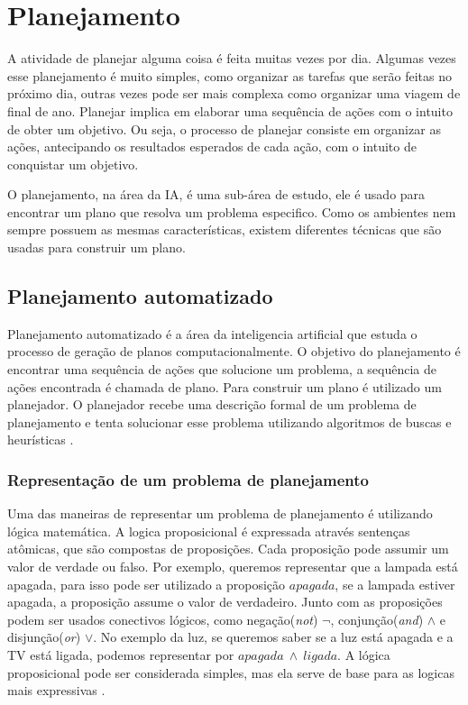 \chapter{\label{chap:planejamento}Planejamento}

A atividade de planejar alguma coisa é feita muitas vezes por dia. Algumas vezes esse planejamento é muito simples, como organizar as tarefas que serão feitas no próximo dia, outras vezes pode ser mais complexa como organizar uma viagem de final de ano. Planejar implica em elaborar uma sequência de ações com o intuito de obter um objetivo. Ou seja, o processo de planejar consiste em organizar as ações, antecipando os resultados esperados de cada ação, com o intuito de conquistar um objetivo. 

O planejamento, na área da IA, é uma sub-área de estudo, ele é usado para encontrar um plano que resolva um problema especifico. Como os ambientes nem sempre possuem as mesmas características, existem diferentes técnicas que são usadas para construir um plano.

\section{Planejamento automatizado}

Planejamento automatizado é a área da inteligencia artificial que estuda o processo de geração de planos computacionalmente. O objetivo do planejamento é encontrar uma sequência de ações que solucione um problema, a sequência de ações encontrada é chamada de plano. Para construir um plano é utilizado um planejador. O planejador recebe uma descrição formal de um problema de planejamento e tenta solucionar esse problema utilizando algoritmos de buscas e heurísticas \cite{ghallab2004automated, intelligence2003modern}.   

\subsection{Representação de um problema de planejamento}

Uma das maneiras de representar um problema de planejamento é utilizando lógica matemática. A logica proposicional é expressada através sentenças atômicas, que são compostas de proposições. Cada proposição pode assumir um valor de verdade ou falso. Por exemplo, queremos representar que a lampada está apagada, para isso pode ser utilizado a proposição $apagada$, se a lampada estiver apagada, a proposição assume o valor de verdadeiro. Junto com as proposições podem ser usados conectivos lógicos, como negação(\textit{not}) $\neg$, conjunção(\textit{and}) $\wedge$ e disjunção(\textit{or}) $\vee$. No exemplo da luz, se queremos saber se a luz está apagada e a TV está ligada, podemos representar por $apagada~ \wedge~ ligada$. A lógica proposicional pode ser considerada simples, mas ela serve de base para as logicas mais expressivas \cite{intelligence2003modern}. 

